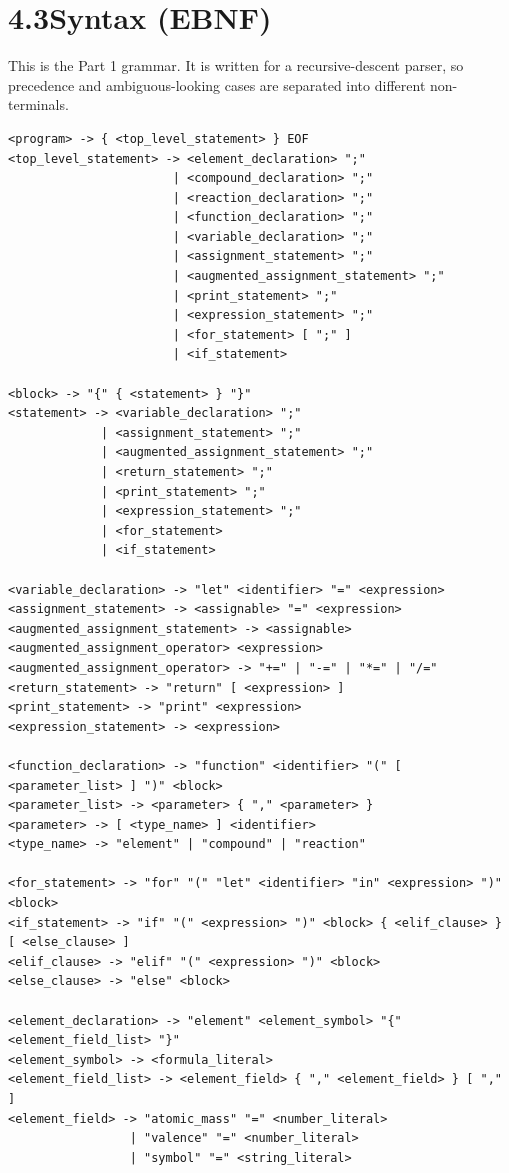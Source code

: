 \documentclass[11pt,a4paper]{article}
\begin{document}
\section{4.3\quad Syntax (EBNF)}

This is the Part 1 grammar. It is written for a recursive-descent parser, so precedence and
ambiguous-looking cases are separated into different non-terminals.

\begin{lstlisting}[style=ebnf]
<program> -> { <top_level_statement> } EOF
<top_level_statement> -> <element_declaration> ";"
                       | <compound_declaration> ";"
                       | <reaction_declaration> ";"
                       | <function_declaration> ";"
                       | <variable_declaration> ";"
                       | <assignment_statement> ";"
                       | <augmented_assignment_statement> ";"
                       | <print_statement> ";"
                       | <expression_statement> ";"
                       | <for_statement> [ ";" ]
                       | <if_statement>

<block> -> "{" { <statement> } "}"
<statement> -> <variable_declaration> ";"
             | <assignment_statement> ";"
             | <augmented_assignment_statement> ";"
             | <return_statement> ";"
             | <print_statement> ";"
             | <expression_statement> ";"
             | <for_statement>
             | <if_statement>

<variable_declaration> -> "let" <identifier> "=" <expression>
<assignment_statement> -> <assignable> "=" <expression>
<augmented_assignment_statement> -> <assignable> <augmented_assignment_operator> <expression>
<augmented_assignment_operator> -> "+=" | "-=" | "*=" | "/="
<return_statement> -> "return" [ <expression> ]
<print_statement> -> "print" <expression>
<expression_statement> -> <expression>

<function_declaration> -> "function" <identifier> "(" [ <parameter_list> ] ")" <block>
<parameter_list> -> <parameter> { "," <parameter> }
<parameter> -> [ <type_name> ] <identifier>
<type_name> -> "element" | "compound" | "reaction"

<for_statement> -> "for" "(" "let" <identifier> "in" <expression> ")" <block>
<if_statement> -> "if" "(" <expression> ")" <block> { <elif_clause> } [ <else_clause> ]
<elif_clause> -> "elif" "(" <expression> ")" <block>
<else_clause> -> "else" <block>

<element_declaration> -> "element" <element_symbol> "{" <element_field_list> "}"
<element_symbol> -> <formula_literal>
<element_field_list> -> <element_field> { "," <element_field> } [ "," ]
<element_field> -> "atomic_mass" "=" <number_literal>
                 | "valence" "=" <number_literal>
                 | "symbol" "=" <string_literal>


\end{lstlisting}
\end{document}
